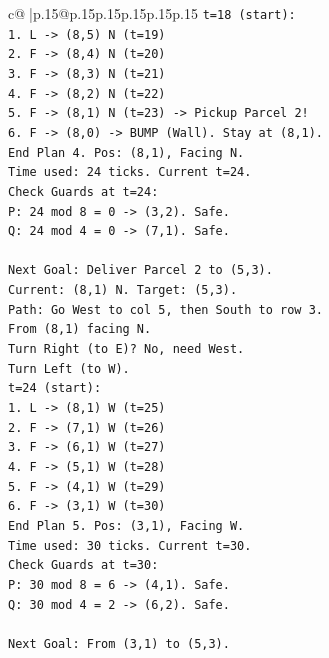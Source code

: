 \documentclass{article}
\begin{document}
{\begin{supertabular}{c@{$\;$}|p{.15\linewidth}@{}p{.15\linewidth}p{.15\linewidth}p{.15\linewidth}p{.15\linewidth}p{.15\linewidth}}
{{{\texttt{t=18 (start):} \\
\texttt{1. L {-}> (8,5) N (t=19)} \\
\texttt{2. F {-}> (8,4) N (t=20)} \\
\texttt{3. F {-}> (8,3) N (t=21)} \\
\texttt{4. F {-}> (8,2) N (t=22)} \\
\texttt{5. F {-}> (8,1) N (t=23) {-}> Pickup Parcel 2!} \\
\texttt{6. F {-}> (8,0) {-}> BUMP (Wall). Stay at (8,1).} \\
\texttt{End Plan 4. Pos: (8,1), Facing N.} \\
\texttt{Time used: 24 ticks. Current t=24.} \\
\texttt{Check Guards at t=24:} \\
\texttt{P: 24 mod 8 = 0 {-}> (3,2). Safe.} \\
\texttt{Q: 24 mod 4 = 0 {-}> (7,1). Safe.} \\
\\ 
\texttt{Next Goal: Deliver Parcel 2 to (5,3).} \\
\texttt{Current: (8,1) N. Target: (5,3).} \\
\texttt{Path: Go West to col 5, then South to row 3.} \\
\texttt{From (8,1) facing N.} \\
\texttt{Turn Right (to E)? No, need West.} \\
\texttt{Turn Left (to W).} \\
\texttt{t=24 (start):} \\
\texttt{1. L {-}> (8,1) W (t=25)} \\
\texttt{2. F {-}> (7,1) W (t=26)} \\
\texttt{3. F {-}> (6,1) W (t=27)} \\
\texttt{4. F {-}> (5,1) W (t=28)} \\
\texttt{5. F {-}> (4,1) W (t=29)} \\
\texttt{6. F {-}> (3,1) W (t=30)} \\
\texttt{End Plan 5. Pos: (3,1), Facing W.} \\
\texttt{Time used: 30 ticks. Current t=30.} \\
\texttt{Check Guards at t=30:} \\
\texttt{P: 30 mod 8 = 6 {-}> (4,1). Safe.} \\
\texttt{Q: 30 mod 4 = 2 {-}> (6,2). Safe.} \\
\\ 
\texttt{Next Goal: From (3,1) to (5,3).} \\
}}}
\end{supertabular}}
\end{document}
